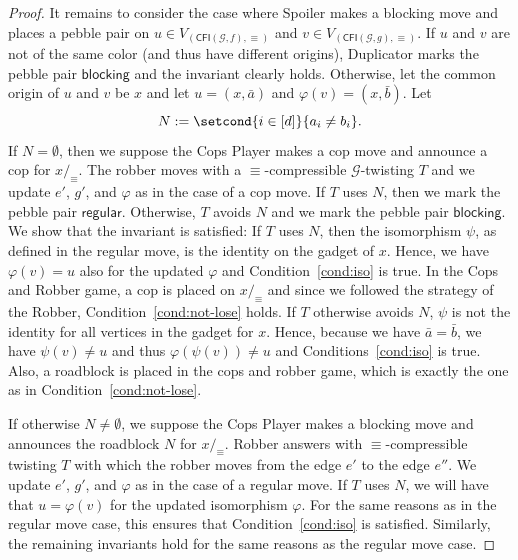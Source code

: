 \documentclass[a4paper,english, thm-restate]{lipics-v2021}
\newcommand{\regular}{\mathsf{regular}}
\newcommand{\blocking}{\mathsf{blocking}}
\renewcommand{\phi}{\varphi}
\newcommand{\comp}{\equiv}
\newcommand{\CFIsym}{\mathsf{CFI}}
\newcommand{\CFI}[1]{\CFIsym(#1)}
\newcommand{\precompCFI}[2]{{(\CFI{#1},#2)}}
\newcommand{\tup}[1]{\bar{#1}}
\newcommand{\graphG}{\mathcal{G}}
\begin{document}
\begin{proof}
        It remains to consider the case where Spoiler makes a blocking move
        and places a pebble pair on  $u \in V_{\precompCFI{\graphG,f}{\comp}}$
        and $v \in V_{\precompCFI{\graphG,g}{\comp}}$.
       	If $u$ and $v$ are not of the same color (and thus have different origins),
        Duplicator marks the pebble pair $\blocking$ and the invariant clearly holds.
      	Otherwise, let the common origin of $u$ and $v$ be $x$
      	and let $u=(x,\tup{a})$ and $\phi(v)=(x, \tup{b})$.
      	Let \[N:=\setcond{i \in [d]} { a_i \neq b_i}.\]
      	If $N = \emptyset$, then we suppose the Cops Player makes a cop move and
      	announce a cop for $x/_\comp$.
      	The robber moves with a $\comp$-compressible $\graphG$-twisting $T$
      	and we update $e'$, $g'$, and $\phi$ as in the case of a cop move.
      	If $T$ uses $N$, then we mark the pebble pair $\regular$.
      	Otherwise, $T$ avoids $N$ and we mark the pebble pair $\blocking$.
      	We show that the invariant is satisfied:
      	If $T$ uses $N$,
      	then the isomorphism $\psi$, as defined in the regular move,
      	is the identity on the gadget of $x$.
      	Hence, we have $\phi(v) = u$ also for the updated $\phi$
      	and 
      	Condition~\ref{cond:iso} is true.
      	In the Cops and Robber game, a cop is placed on $x/_\comp$ and since we followed the strategy of the Robber, Condition~\ref{cond:not-lose} holds.
      	If $T$ otherwise avoids $N$,
      	$\psi$ is not the identity for all vertices in the gadget for $x$.
      	Hence, because we have $\tup{a} = \tup{b}$,
      	we have $\psi(v) \neq u$ and thus $\phi(\psi(v)) \neq u$
      	and 
      	Conditions~\ref{cond:iso} is true.
      	Also, a roadblock is placed in the cops and robber game,
      	which is exactly the one as in Condition~\ref{cond:not-lose}.
      	
      	If otherwise $N\neq \emptyset$,
      	we suppose the Cops Player makes a blocking move
      	and announces the roadblock $N$
      	for $x/_\comp$.
      	Robber answers with $\comp$-compressible twisting
      	$T$ with which the robber moves
      	from the edge $e'$ to the edge $e''$.
      	We update $e'$, $g'$, and $\phi$ as in the case of a regular move.
      	If $T$ uses $N$,
      	we will have that $u = \phi(v)$ for the updated isomorphism $\phi$.
      	For the same reasons as in the 
%
      	 regular move case,
      	this ensures that Condition~\ref{cond:iso} is satisfied.
      	Similarly, the remaining invariants hold for the same reasons as the 
      	regular move case.
      	

\end{proof}
\end{document}
